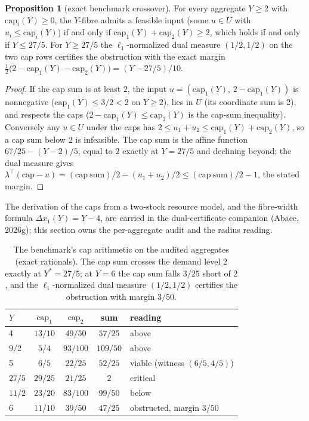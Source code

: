\documentclass[10pt,twocolumn]{article}
\theoremstyle{definition}
\newtheorem{proposition}{Proposition}
\begin{document}
\begin{proposition}[exact benchmark crossover]\label{prop:bench}
For every aggregate \(Y \ge 2\) with \(\mathrm{cap}_i(Y) \ge 0\), the
\(Y\)-fibre admits a feasible input (some \(u \in U\) with
\(u_i \le \mathrm{cap}_i(Y)\)) if and only if
\(\mathrm{cap}_1(Y) + \mathrm{cap}_2(Y) \ge 2\), which holds if and
only if \(Y \le 27/5\). For \(Y \ge 27/5\) the
\(\ell_1\)-normalized dual measure \((1/2, 1/2)\) on the two cap rows
certifies the obstruction with the exact margin
\(\tfrac12\bigl(2 - \mathrm{cap}_1(Y) - \mathrm{cap}_2(Y)\bigr) =
(Y - 27/5)/10\).
\end{proposition}

\begin{proof}
If the cap sum is at least \(2\), the input
\(u = (\mathrm{cap}_1(Y),\, 2 - \mathrm{cap}_1(Y))\) is nonnegative
(\(\mathrm{cap}_1(Y) \le 3/2 < 2\) on \(Y \ge 2\)), lies in
\(U\) (its coordinate sum is \(2\)), and respects the caps
(\(2 - \mathrm{cap}_1(Y) \le \mathrm{cap}_2(Y)\) is the cap-sum
inequality). Conversely any \(u \in U\) under the caps has
\(2 \le u_1 + u_2 \le \mathrm{cap}_1(Y) + \mathrm{cap}_2(Y)\), so a
cap sum below \(2\) is infeasible. The cap sum is the affine function
\(67/25 - (Y - 2)/5\), equal to \(2\) exactly at \(Y = 27/5\) and
declining beyond; the dual measure gives
\(\lambda^\top(\mathrm{cap} - u) = (\mathrm{cap\ sum})/2 -
(u_1 + u_2)/2 \le (\mathrm{cap\ sum})/2 - 1\), the stated margin.
\end{proof}

The derivation of the caps from a two-stock resource model, and the
fibre-width formula \(\Delta x_1(Y) = Y - 4\), are carried in the
dual-certificate companion (Abaee, 2026g); this section owns the
per-aggregate audit and the radius reading.

\begin{table}[t]
\centering
\footnotesize
\caption{The benchmark's cap arithmetic on the audited aggregates
(exact rationals). The cap sum crosses the demand level \(2\) exactly
at \(Y^{*} = 27/5\); at \(Y = 6\) the cap sum falls \(3/25\) short of
\(2\), and the \(\ell_1\)-normalized dual measure \((1/2, 1/2)\) certifies the
obstruction with margin \(3/50\).}
\label{tab:bench}
\begin{tabular}{@{}l c c c l@{}}
\toprule
\(Y\) & \(\mathrm{cap}_1\) & \(\mathrm{cap}_2\) & sum & reading\\
\midrule
4 & $13/10$ & $49/50$ & $57/25$ & above\\
$9/2$ & $5/4$ & $93/100$ & $109/50$ & above\\
5 & $6/5$ & $22/25$ & $52/25$ & viable (witness $(6/5, 4/5)$)\\
$27/5$ & $29/25$ & $21/25$ & $2$ & critical\\
$11/2$ & $23/20$ & $83/100$ & $99/50$ & below\\
6 & $11/10$ & $39/50$ & $47/25$ & obstructed, margin $3/50$\\
\bottomrule
\end{tabular}
\end{table}
\end{document}
